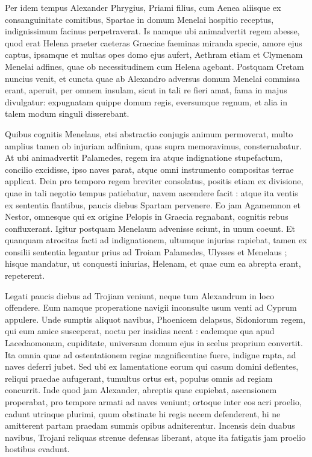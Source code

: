 \documentclass{article}
\begin{document}
\begin{pages}
\begin{Rightside}
Per idem tempus Alexander Phrygius, Priami filius, cum Aenea aliisque ex consanguinitate comitibus, Spartae in domum Menelai hospitio receptus, indignissimum facinus perpetraverat. Is namque ubi animadvertit regem abesse, quod erat Helena praeter caeteras Graeciae faeminas miranda specie, amore ejus captus, ipsamque et multas opes domo ejus aufert, Aethram etiam et Clymenam Menelai adfines, quae ob necessitudinem cum Helena agebant. Postquam Cretam nuncius venit, et cuncta quae ab Alexandro adversus domum Menelai commissa erant, aperuit, per omnem insulam, sicut in tali re fieri amat, fama in majus divulgatur: expugnatam quippe domum regis, eversumque regnum, et alia in talem modum singuli disserebant.


Quibus cognitis Menelaus, etsi abstractio conjugis animum permoverat, multo amplius tamen ob injuriam adfinium, quas supra memoravimus, consternabatur. At ubi animadvertit Palamedes, regem ira atque indignatione stupefactum, concilio excidisse, ipso naves parat, atque omni instrumento compositas terrae applicat. Dein pro temporo regem breviter consolatus, positis etiam ex divisione, quae in tali negotio tempus patiebatur, navem ascendere facit : atque ita ventis ex sententia flantibus, paucis diebus Spartam pervenere. Eo jam Agamemnon et Nestor, omnesque qui ex origine Pelopis in Graecia regnabant, cognitis rebus confluxerant. Igitur postquam Menelaum advenisse sciunt, in unum coeunt. Et quanquam atrocitas facti ad indignationem, ultumque injurias rapiebat, tamen ex consilii sententia legantur prius ad Troiam Palamedes, Ulysses et Menelaus ; hisque mandatur, ut conquesti iniurias, Helenam, et quae cum ea abrepta erant, repeterent.

Legati paucis diebus ad Trojiam veniunt, neque tum Alexandrum in loco offendere. Eum namque properatione navigii inconsulte usum venti ad Cyprum appulere. Unde sumptis aliquot navibus, Phoenicem delapsus, Sidoniorum regem, qui eum amice susceperat, noctu per insidias necat : eademque qua apud Lacedaomonam, cupiditate, universam domum ejus in scelus proprium convertit. Ita omnia quae ad ostentationem regiae magnificentiae fuere, indigne rapta, ad naves deferri jubet. Sed ubi ex lamentatione eorum qui casum domini deflentes, reliqui praedae aufugerant, tumultus ortus est, populus omnis ad regiam concurrit. Inde quod jam Alexander, abreptis quae cupiebat, ascensionem properabat, pro tempore armati ad naves veniunt; ortoque inter eos acri proelio, cadunt utrinque plurimi, quum obstinate hi regis necem defenderent, hi ne amitterent partam praedam summis opibus adniterentur. Incensis dein duabus navibus, Trojani reliquas strenue defensas liberant, atque ita fatigatis jam proelio hostibus evadunt.

\endnumbering
\end{Rightside}

\end{pages}
\Pages
\end{document}
